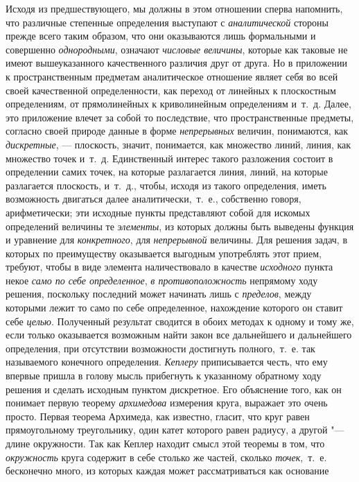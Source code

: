 {Исходя из предшествующего, мы должны в этом отношении сперва напомнить, что
различные степенные определения выступают с
{\em аналитической} стороны прежде всего таким образом,
что они оказываются лишь формальными и совершенно
{\em однородными}, означают
{\em числовые величины}, которые как таковые не имеют
вышеуказанного качественного различия друг от друга. Но в приложении к
пространственным предметам аналитическое отношение являет себя во всей
своей качественной определенности, как переход от линейных к плоскостным
определениям, от прямолинейных к криволинейным определениям и~т.~д. Далее,
это приложение влечет за собой то последствие, что пространственные
предметы, согласно своей природе данные в форме
{\em непрерывных} величин, понимаются, как
{\em дискретные}, — плоскость, значит, понимается, как
множество линий, линия, как множество точек и~т.~д. Единственный интерес
такого разложения состоит в определении самих точек, на которые разлагается
линия, линий, на которые разлагается плоскость, и~т.~д., чтобы, исходя из
такого определения, иметь возможность двигаться далее аналитически,~т.~е.,
собственно говоря, арифметически; эти исходные пункты представляют собой
для искомых определений величины те {\em элементы}, из
которых должны быть выведены функция и уравнение для
{\em конкретного}, для
{\em непрерывной} величины. Для решения задач, в
которых по преимуществу оказывается выгодным употреблять этот прием,
требуют, чтобы в виде элемента наличествовало в качестве
{\em исходного} пункта некое
{\em само по себе определенное},
{\em в противоположность} непрямому ходу решения,
поскольку последний может начинать лишь с
{\em пределов}, между которыми лежит то само по себе
определенное, нахождение которого он ставит себе
{\em целью}. Полученный результат сводится в обоих
методах к одному и тому же, если только оказывается возможным найти закон
все дальнейшего и дальнейшего определения, при отсутствии возможности
достигнуть полного,~т.~е. так называемого конечного определения.
{\em Кеплеру} приписывается честь, что ему впервые
пришла в голову мысль прибегнуть к указанному обратному ходу решения и
сделать исходным пунктом дискретное. Его объяснение того, как он понимает
первую теорему {\em архимедова} измерения круга,
выражает это очень просто. Первая теорема Архимеда, как известно, гласит,
что круг равен прямоугольному треугольнику, один катет которого равен
радиусу, а другой "--- длине окружности. Так как Кеплер находит смысл этой
теоремы в том, что {\em окружность} круга содержит в
себе столько же частей, сколько {\em точек},~т.~е.
бесконечно много, из которых каждая может рассматриваться как основание
}
